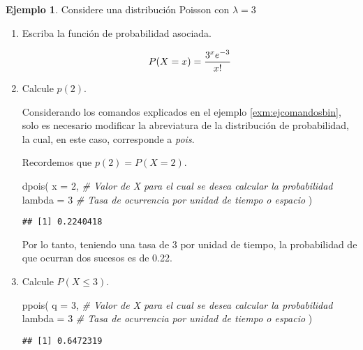 \documentclass[
]{book}
\newenvironment{Shaded}{\begin{snugshade}}{\end{snugshade}}
\newcommand{\AttributeTok}[1]{\textcolor[rgb]{0.77,0.63,0.00}{#1}}
\newcommand{\CommentTok}[1]{\textcolor[rgb]{0.56,0.35,0.01}{\textit{#1}}}
\newcommand{\DecValTok}[1]{\textcolor[rgb]{0.00,0.00,0.81}{#1}}
\newcommand{\FunctionTok}[1]{\textcolor[rgb]{0.00,0.00,0.00}{#1}}
\newcommand{\NormalTok}[1]{#1}
\theoremstyle{definition}
\theoremstyle{definition}
\newtheorem{example}{Ejemplo}[chapter]
\theoremstyle{definition}
\theoremstyle{definition}
\theoremstyle{remark}
\begin{document}
\begin{example}

Considere una distribución Poisson con \(\lambda = 3\)

\begin{enumerate}
\def\labelenumi{\alph{enumi}.}
\item
  Escriba la función de probabilidad asociada.

  \begin{equation}
  \notag
  P(X=x) = \dfrac{3^xe^{-3}}{x!}
  \end{equation}
\item
  Calcule \(p(2)\).

  Considerando los comandos explicados en el ejemplo \ref{exm:ejcomandosbin}, solo es necesario modificar la abreviatura de la distribución de probabilidad, la cual, en este caso, corresponde a \emph{pois}.

  Recordemos que \(p(2) = P(X = 2)\).

\begin{Shaded}
\begin{Highlighting}[]
\FunctionTok{dpois}\NormalTok{(}
  \AttributeTok{x =} \DecValTok{2}\NormalTok{, }\CommentTok{\# Valor de X para el cual se desea calcular la probabilidad}
  \AttributeTok{lambda =} \DecValTok{3} \CommentTok{\# Tasa de ocurrencia por unidad de tiempo o espacio}
\NormalTok{  )}
\end{Highlighting}
\end{Shaded}

\begin{verbatim}
## [1] 0.2240418
\end{verbatim}

  Por lo tanto, teniendo una tasa de 3 por unidad de tiempo, la probabilidad de que ocurran dos sucesos es de 0.22.
\item
  Calcule \(P(X\leq 3)\).

\begin{Shaded}
\begin{Highlighting}[]
\FunctionTok{ppois}\NormalTok{(}
  \AttributeTok{q =} \DecValTok{3}\NormalTok{, }\CommentTok{\# Valor de X para el cual se desea calcular la probabilidad}
  \AttributeTok{lambda =} \DecValTok{3} \CommentTok{\# Tasa de ocurrencia por unidad de tiempo o espacio}
\NormalTok{  )}
\end{Highlighting}
\end{Shaded}

\begin{verbatim}
## [1] 0.6472319
\end{verbatim}


\end{enumerate}
\end{example}
\end{document}
